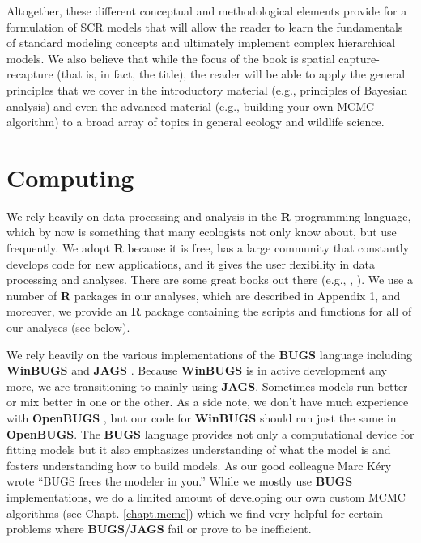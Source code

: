 Altogether, these different conceptual and methodological elements
provide for a formulation of SCR models that will allow the reader to 
learn the fundamentals of standard modeling concepts and ultimately
implement complex hierarchical models.  We also believe that 
while the focus of the book is spatial capture-recapture (that is,
in fact, the title), the reader will be able to apply the general
principles that we cover in the introductory material (e.g., principles
of Bayesian analysis) and even the advanced material (e.g., building
your own MCMC algorithm) to a broad array of topics in general ecology
and wildlife science.   



\section*{Computing}

We rely heavily on data processing and analysis in the {\bf R}
programming language, which by now is something that many ecologists
not only know about, but use frequently.  We adopt {\bf R} because it
is free, has a large community that constantly develops code for new
applications, and it gives the user flexibility in data processing and
analyses.  There are some great books out there (e.g.,
\citet{bolker:2008}, \citet{zuur_etal:2009}).
We use a number of {\bf
  R} packages in our analyses, which are described in Appendix 1, and
moreover, we provide an {\bf R} package containing the scripts and
functions for all of our analyses (see below).

We rely heavily on the various implementations of the {\bf BUGS}
language including {\bf WinBUGS} \citep{lunn_etal:2000} and {\bf JAGS}
\citep{plummer:2003}.  Because {\bf WinBUGS} is in active development
any more, we are transitioning to mainly using {\bf JAGS}.  Sometimes
models run better or mix better in one or the other. As a side note,
we don't have much experience with {\bf OpenBUGS}
\citep{thomas_etal:2006}, but our code for {\bf WinBUGS} should run
just the same in {\bf OpenBUGS}. The {\bf BUGS} language provides not
only a computational device for fitting models but it also emphasizes
understanding of what the model is and fosters understanding how to
build models.  As our good colleague Marc K\'{e}ry wrote 
\citep[][p. 30]{kery:2010}
``BUGS frees the modeler in you.'' 
While we mostly use {\bf BUGS} implementations,
we do a limited amount of developing our own custom MCMC algorithms
(see Chapt. \ref{chapt.mcmc}) which we find very helpful for certain
problems where {\bf BUGS}/{\bf JAGS} fail or prove to be inefficient.

